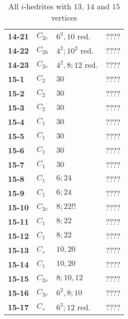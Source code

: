 \documentclass[12pt]{article}
\begin{document}
\begin{table}
\begin{center}
{\begin{minipage}[t]{7cm}
\begin{tabular}{||l|l|l|l||}
{\bf 14-21}     &$C_{2v}$       &$6^3, 10$ red. &????\\
{\bf 14-22}     &$C_{2h}$       &$4^2; 10^2$ red.       &????\\
{\bf 14-23}     &$C_{2v}$       &$4^2, 8; 12$ red.      &????\\\hline
{\bf 15-1}      &$C_2$  &$30$   &????\\
{\bf 15-2}      &$C_2$  &$30$   &????\\
{\bf 15-3}      &$C_2$  &$30$   &????\\
{\bf 15-4}      &$C_1$  &$30$   &????\\
{\bf 15-5}      &$C_1$  &$30$   &????\\
{\bf 15-6}      &$C_1$  &$30$   &????\\
{\bf 15-7}      &$C_1$  &$30$   &????\\
{\bf 15-8}      &$C_1$  &$6; 24$        &????\\
{\bf 15-9}      &$C_1$  &$6; 24$        &????\\
{\bf 15-10}     &$C_{2v}$       &$8;22!!$     &????\\
{\bf 15-11}     &$C_1$  &$8; 22$        &????\\
{\bf 15-12}     &$C_1$  &$8; 22$        &????\\
{\bf 15-13}     &$C_s$  &$10, 20$       &????\\
{\bf 15-14}     &$C_1$  &$10,20$        &????\\
{\bf 15-15}     &$C_{2v}$       &$8;10,12$      &????\\
{\bf 15-16}     &$C_{2v}$       &$6^2,8;10$     &????\\
{\bf 15-17}     &$C_s$  &$6^3; 12$ red. &????\\\hline
\hline
\end{tabular}
\end{minipage}
}
\end{center}
\caption{All $i$-hedrites with $13$, $14$ and $15$ vertices}
\label{tab:i-hedrite13_14}
\end{table}
\end{document}
